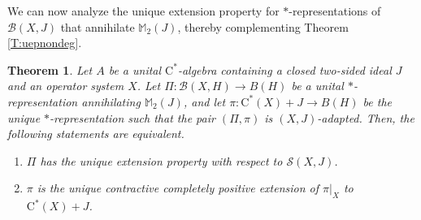 \documentclass[10pt]{amsart}
\newcommand{\bM}{{\mathbb{M}}}
\newcommand{\B}{{\mathcal{B}}}
\renewcommand{\S}{{\mathcal{S}}}
\newcommand{\rC}{\mathrm{C}}
\newtheorem{theorem}[lemma]{Theorem}
\theoremstyle{definition}
\begin{document}
We can now analyze the unique extension property for $*$-representations of $\B(X,J)$ that annihilate $\bM_2(J)$, thereby complementing Theorem \ref{T:uepnondeg}.

\begin{theorem}\label{T:singrepuep}
Let $A$ be a unital $\rC^*$-algebra containing a closed two-sided ideal $J$ and an operator system $X$. Let $\Pi:\B(X,H)\to B(H)$ be a unital $*$-representation annihilating $\bM_2(J)$, and let $\pi:\rC^*(X)+J\to B(H)$ be the unique $*$-representation such that the pair $(\Pi,\pi)$ is $(X,J)$-adapted. Then, the following statements are equivalent.
\begin{enumerate}[{\rm (i)}]
\item $\Pi$ has the unique extension property with respect to $\S(X,J)$.
\item $\pi$ is the  unique contractive completely positive extension of $\pi|_X$ to $\rC^*(X)+J$.
\end{enumerate}
\end{theorem}
\end{document}
